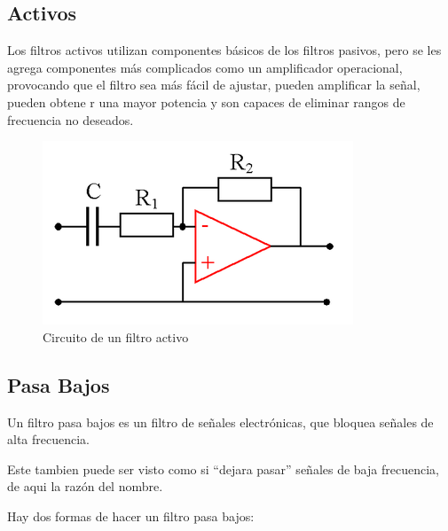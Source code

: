 \documentclass[../main.tex]{subfiles}
\begin{document}
{	
	\renewcommand{\subsectionbreak}{}
	\subsection{Activos}
	Los filtros activos utilizan componentes básicos de los 
	filtros pasivos, pero se les agrega componentes más complicados
	como un amplificador operacional, provocando que el filtro sea
	más fácil de ajustar, pueden amplificar la señal, pueden obtene
	r una mayor potencia y son capaces de eliminar rangos de 
	frecuencia no deseados.
	\begin{figure}[H]
		\includegraphics[width=0.6 \textwidth]{filtros/filtro_activo.png}
		\centering
		\caption{Circuito de un filtro activo}
	\end{figure}
}


	\subsection{Pasa Bajos}
	Un filtro pasa bajos es un filtro de señales electrónicas, que bloquea señales de alta
	frecuencia.

	Este tambien puede ser visto como si ``dejara pasar'' señales de baja frecuencia, de aqui
	la razón del nombre.

	Hay dos formas de hacer un filtro pasa bajos:

\end{document}
